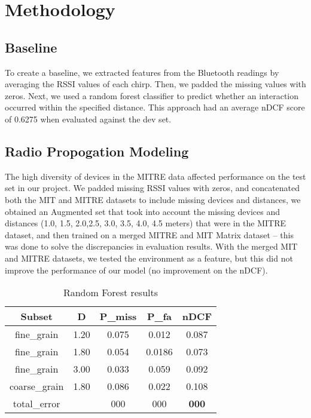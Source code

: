\documentclass[conference]{IEEEtran}
\begin{document}

\section{Methodology}

\subsection{Baseline}
To create a baseline, we extracted features from the Bluetooth readings by averaging the RSSI values of each chirp. Then, we padded the missing values with zeros. Next, we used a random forest classifier to predict whether an interaction occurred within the specified distance. This approach had an average nDCF score of 0.6275 when evaluated against the dev set.\\


\subsection{Radio Propogation Modeling}
The high diversity of devices in the MITRE data affected performance on the test set in our project. We padded missing RSSI values with zeros, and concatenated both the MIT and MITRE datasets \cite{b6} \cite{b7} to include missing devices and distances, we obtained an Augmented set that took into account the missing devices and distances (1.0, 1.5, 2.0,2.5, 3.0, 3.5, 4.0, 4.5 meters) that were in the MITRE dataset, and then trained on a merged MITRE and MIT Matrix dataset – this was done to solve the discrepancies in evaluation results. With the merged MIT and MITRE datasets, we tested the environment as a feature, but this did not improve the performance of our model (no improvement on the nDCF).\\

\begin{table}[h!]
\begin{center}
\begin{tabular}{ c c c c c }
 Subset & D & P\_miss & P\_fa & nDCF  \\ \hline
 fine\_grain & 1.20 & 0.075 & 0.012 & 0.087 \\ 
 fine\_grain & 1.80 & 0.054 & 0.0186 & 0.073 \\  
 fine\_grain & 3.00 & 0.033 & 0.059 & 0.092 \\
 coarse\_grain & 1.80 & 0.086 & 0.022 & 0.108 \\ \hline
 total\_error & & 000 & 000 & \textbf{000}
\end{tabular} \vspace{0.25cm}
\caption{Random Forest results}
\label{table:c_m3}
\end{center}
\end{table}
\end{document}
